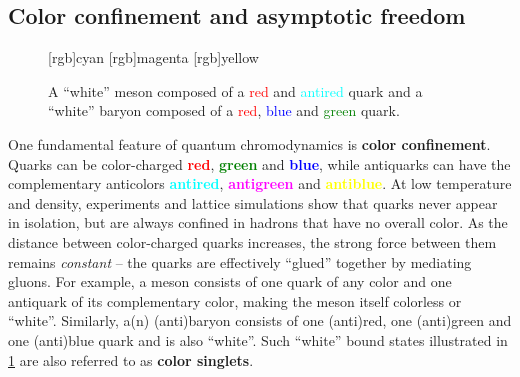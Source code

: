 \subsection{Color confinement and asymptotic freedom}


\begin{figure}[t]
\centering
{}
[rgb]{cyan}
[rgb]{magenta}
[rgb]{yellow}
\caption{\label{fig:qcd:colorless_hadrons}%
	A ``white'' meson composed of a \textcolor{red}{red} and \textcolor{cyan}{antired} quark and
	a ``white'' baryon composed of a \textcolor{red}{red}, \textcolor{blue}{blue} and \textcolor{green}{green} quark.
}
\end{figure}

One fundamental feature of quantum chromodynamics is \textbf{color confinement}.
Quarks can be color-charged \textcolor{red}{\textbf{red}}, \textcolor{green}{\textbf{green}} and \textcolor{blue}{\textbf{blue}},
while antiquarks can have the complementary anticolors \textcolor{cyan}{\textbf{antired}}, \textcolor{magenta}{\textbf{antigreen}} and \textcolor{yellow}{\textbf{antiblue}}.
At low temperature and density, experiments and lattice simulations show that quarks never appear in isolation, but are always confined in hadrons that have no overall color.
As the distance between color-charged quarks increases, the strong force between them remains \emph{constant} -- the quarks are  effectively ``glued'' together by mediating gluons.
For example, a meson consists of one quark of any color and one antiquark of its complementary color, making the meson itself colorless or ``white''.
Similarly, a(n) (anti)baryon consists of one (anti)red, one (anti)green and one (anti)blue quark and is also ``white''.
Such ``white'' bound states illustrated in \cref{fig:qcd:colorless_hadrons} are also referred to as \textbf{color singlets}.

